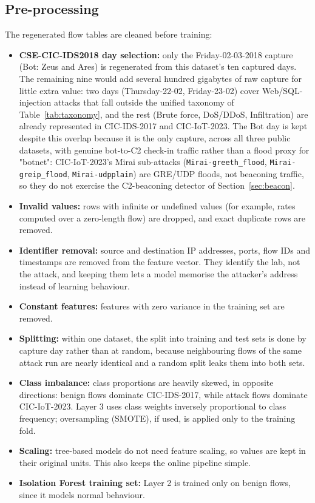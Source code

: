 \subsection{Pre-processing}\label{sec:5.2.4}
\label{sec:preprocessing}
\noindent The regenerated flow tables are cleaned before training:
\begin{itemize}
    \item \textbf{CSE-CIC-IDS2018 day selection:} only the Friday-02-03-2018 capture (Bot: Zeus and Ares) is regenerated from this dataset's ten captured days. The remaining nine would add several hundred gigabytes of raw capture for little extra value: two days (Thursday-22-02, Friday-23-02) cover Web/SQL-injection attacks that fall outside the unified taxonomy of Table~\ref{tab:taxonomy}, and the rest (Brute force, DoS/DDoS, Infiltration) are already represented in CIC-IDS-2017 and CIC-IoT-2023. The Bot day is kept despite this overlap because it is the only capture, across all three public datasets, with genuine bot-to-C2 check-in traffic rather than a flood proxy for "botnet": CIC-IoT-2023's Mirai sub-attacks (\texttt{Mirai-greeth\_flood}, \texttt{Mirai-greip\_flood}, \texttt{Mirai-udpplain}) are GRE/UDP floods, not beaconing traffic, so they do not exercise the C2-beaconing detector of Section~\ref{sec:beacon}.
    \item \textbf{Invalid values:} rows with infinite or undefined values (for example, rates computed over a zero-length flow) are dropped, and exact duplicate rows are removed.
    \item \textbf{Identifier removal:} source and destination IP addresses, ports, flow IDs and timestamps are removed from the feature vector. They identify the lab, not the attack, and keeping them lets a model memorise the attacker's address instead of learning behaviour.
    \item \textbf{Constant features:} features with zero variance in the training set are removed.
    \item \textbf{Splitting:} within one dataset, the split into training and test sets is done by capture day rather than at random, because neighbouring flows of the same attack run are nearly identical and a random split leaks them into both sets.
    \item \textbf{Class imbalance:} class proportions are heavily skewed, in opposite directions: benign flows dominate CIC-IDS-2017, while attack flows dominate CIC-IoT-2023. Layer 3 uses class weights inversely proportional to class frequency; oversampling (SMOTE), if used, is applied only to the training fold.
    \item \textbf{Scaling:} tree-based models do not need feature scaling, so values are kept in their original units. This also keeps the online pipeline simple.
    \item \textbf{Isolation Forest training set:} Layer 2 is trained only on benign flows, since it models normal behaviour.
\end{itemize}

